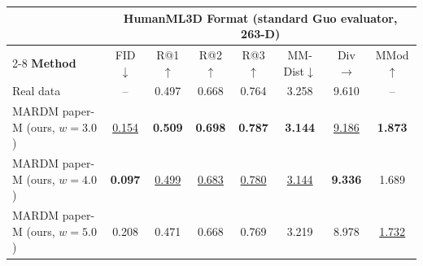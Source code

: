 \begin{tabular}{l|ccccccc}
\hline\hline
 & \multicolumn{7}{c}{\textbf{HumanML3D Format (standard Guo evaluator, 263-D)}} \\
\cline{2-8}
\textbf{Method} & FID$\downarrow$ & R@1$\uparrow$ & R@2$\uparrow$ & R@3$\uparrow$ & MM-Dist$\downarrow$ & Div$\rightarrow$ & MMod$\uparrow$ \\
\hline
Real data & -- & 0.497 & 0.668 & 0.764 & 3.258 & 9.610 & -- \\
\hline
MARDM paper-M (ours, $w=3.0$) & \underline{0.154} & \textbf{0.509} & \textbf{0.698} & \textbf{0.787} & \textbf{3.144} & \underline{9.186} & \textbf{1.873} \\
MARDM paper-M (ours, $w=4.0$) & \textbf{0.097} & \underline{0.499} & \underline{0.683} & \underline{0.780} & \underline{3.144} & \textbf{9.336} & 1.689 \\
MARDM paper-M (ours, $w=5.0$) & 0.208 & 0.471 & 0.668 & 0.769 & 3.219 & 8.978 & \underline{1.732} \\
\hline\hline
\end{tabular}

